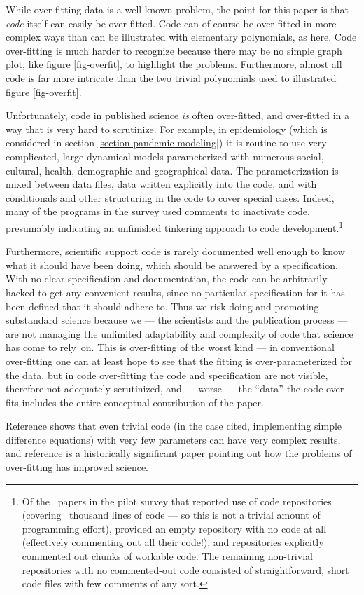 While over-fitting data is a well-known problem, the point for this paper is that \emph{code\/} itself can easily be over-fitted. Code can of course be over-fitted in more complex ways than can be illustrated with elementary polynomials, as here. Code over-fitting is much harder to recognize because there may be no simple graph plot, like figure \ref{fig-overfit}, to highlight the problems. Furthermore, almost all code is far more intricate than the two trivial polynomials used to illustrated figure \ref{fig-overfit}. 

Unfortunately, code in published science \emph{is\/} often over-fitted, and over-fitted in a way that is very hard to scrutinize. For example, in epidemiology (which is considered in section \ref{section-pandemic-modeling}) it is routine to use very complicated, large dynamical models parameterized with numerous social, cultural, health, demographic and geographical data. The parameterization is mixed between data files, data written explicitly into the code, and with conditionals and other structuring in the code to cover special cases. Indeed, many of the programs in the survey used comments to inactivate code, presumably indicating an unfinished tinkering approach to code development.\footnote{Of the \the\countUsesVersionControlRepository\ papers in the pilot survey that reported use of code repositories (covering 
\totalkLOC\ thousand lines of code --- so this is not a trivial amount of programming effort), \numbertoname{\the\countMissingCode} provided an empty repository with no code at all (effectively commenting out all their code!), and \numbertoname{\the\countCommentedOut} repositories explicitly commented out chunks of workable code. The \numbertoname{\the\countNotCommentedOut} remaining non-trivial repositories with no commented-out code consisted of straightforward, short code files with few comments of any sort.\label{name-example-footnote}}

Furthermore, scientific support code is rarely documented well enough to know what it should have been doing, which should be answered by a specification. With no clear specification and documentation, the code can be arbitrarily hacked to get any convenient results, since no particular specification for it has been defined that it should adhere to. Thus we risk doing and promoting substandard science because we --- the scientists and the publication process --- are not managing the unlimited adaptability and complexity of code that science has come to rely~on. This is over-fitting of the worst kind --- in conventional over-fitting one can at least hope to see that the fitting is over-parameterized for the data, but in code over-fitting the code and specification are not visible, therefore not adequately scrutinized, and --- worse --- the ``data'' the code over-fits includes the entire conceptual contribution of the paper. 

Reference \cite{may-simple} shows that even trivial code (in the case cited, implementing simple difference equations) with very few parameters can have very complex results, and reference \cite{dyson} is a historically significant paper pointing out how the problems of over-fitting has improved science.
